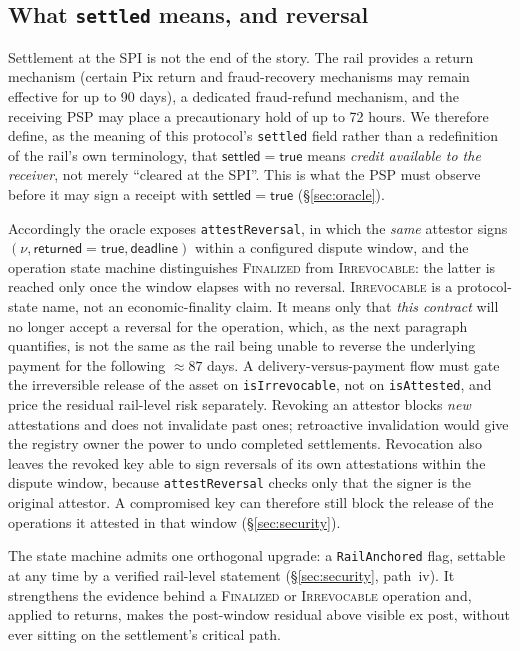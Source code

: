 \documentclass[11pt]{article}
\newcommand{\code}[1]{\texttt{#1}}
\begin{document}
\subsection{What \texttt{settled} means, and reversal}
\label{sec:reversal}
Settlement at the SPI is not the end of the story. The rail provides a return
mechanism (certain Pix return and fraud-recovery mechanisms may remain
effective for up to 90 days), a dedicated fraud-refund mechanism, and the
receiving PSP may place a precautionary hold of up to 72 hours. We therefore
define, as the meaning of this protocol's \code{settled} field rather than a
redefinition of the rail's own terminology, that $\mathsf{settled}=\textsf{true}$
means \emph{credit available to the receiver}, not merely ``cleared at the
SPI''. This is what the PSP must observe before it may sign a receipt with
$\mathsf{settled}=\textsf{true}$ (\S\ref{sec:oracle}).

Accordingly the oracle exposes \code{attestReversal}, in which the \emph{same}
attestor signs $(\nu,\mathsf{returned}=\textsf{true},\mathsf{deadline})$ within a
configured dispute window, and the operation state machine distinguishes
\textsc{Finalized} from \textsc{Irrevocable}: the latter is reached only once the
window elapses with no reversal. \textsc{Irrevocable} is a protocol-state name,
not an economic-finality claim. It means only that \emph{this contract} will no
longer accept a reversal for the operation, which, as the next paragraph
quantifies, is not the same as the rail being unable to reverse the underlying
payment for the following $\approx 87$ days. A delivery-versus-payment flow must
gate the irreversible release of the asset on \code{isIrrevocable}, not on
\code{isAttested}, and price the residual rail-level risk separately. Revoking an
attestor blocks \emph{new} attestations and does not invalidate past ones;
retroactive invalidation would give the registry owner the power to undo
completed settlements. Revocation also leaves the revoked key able to sign
reversals of its own attestations within the dispute window, because
\code{attestReversal} checks only that the signer is the original attestor. A
compromised key can therefore still block the release of the operations it
attested in that window (\S\ref{sec:security}).

The state machine admits one orthogonal upgrade: a \code{RailAnchored} flag,
settable at any time by a verified rail-level statement (\S\ref{sec:security},
path~iv). It strengthens the evidence behind a \textsc{Finalized} or
\textsc{Irrevocable} operation and, applied to returns, makes the post-window
residual above visible ex post, without ever sitting on the settlement's
critical path.
\end{document}
